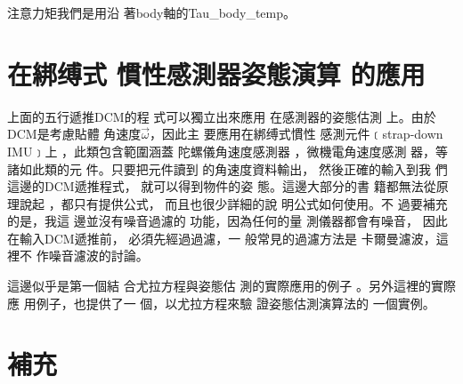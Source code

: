\documentclass{article}
\begin{document}
注意力矩我們是用沿%
著body軸的Tau\_body\_temp。

\part{\protect\bigskip \protect\bigskip 在綁缚式%
慣性感測器姿態演算%
的應用}

上面的五行遞推DCM的程%
式可以獨立出來應用%
在感測器的姿態估測%
上。由於DCM是考慮貼體%
角速度$\vec{\omega}$，因此主%
要應用在綁缚式慣性%
感測元件﹝strap-down IMU﹞上%
，此類包含範圍涵蓋%
陀螺儀角速度感測器%
，微機電角速度感測%
器，等諸如此類的元%
件。只要把元件讀到%
的角速度資料輸出，%
然後正確的輸入到我%
們這邊的DCM遞推程式，%
就可以得到物件的姿%
態。這邊大部分的書%
籍都無法從原理說起%
，都只有提供公式，%
而且也很少詳細的說%
明公式如何使用。不%
過要補充的是，我這%
邊並沒有噪音過濾的%
功能，因為任何的量%
測儀器都會有噪音，%
因此在輸入DCM遞推前，%
必須先經過過濾，一%
般常見的過濾方法是%
卡爾曼濾波，這裡不%
作噪音濾波的討論。

這邊似乎是第一個結%
合尤拉方程與姿態估%
測的實際應用的例子%
。另外這裡的實際應%
用例子，也提供了一%
個，以尤拉方程來驗%
證姿態估測演算法的%
一個實例。

\part{\protect\bigskip 補充}
\end{document}
